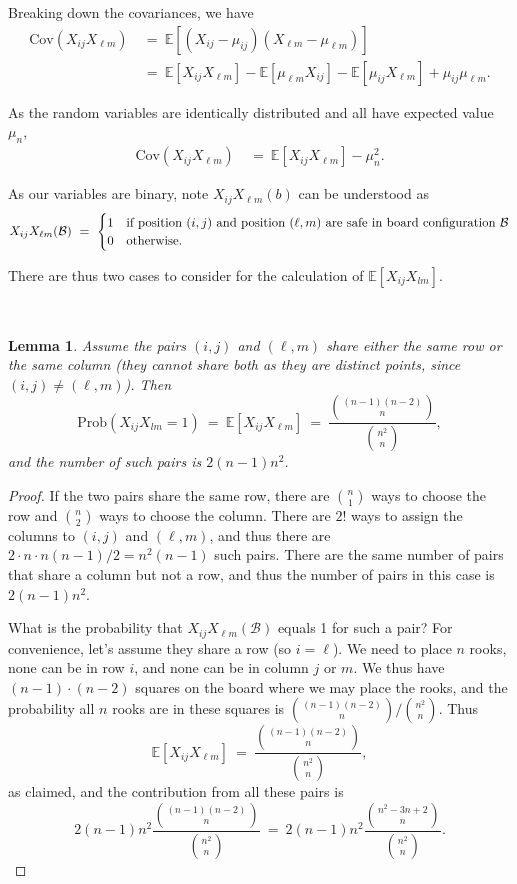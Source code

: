 \documentclass[12pt,reqno]{amsart}
\newcommand{\E}{\mathbb{E}}
\renewcommand{\E}{\mathbb{E}}
\numberwithin{equation}{section}
\newtheorem{lem}[thm]{Lemma}
\theoremstyle{plain}
\newcommand\be{\begin{equation}}
\newcommand\ee{\end{equation}}
\newcommand{\ncr}[2]{{#1 \choose #2}}
\newcommand{\twocase}[5]{#1 \begin{cases} #2 & \text{{\rm #3}}\\ #4 &\text{{\rm #5}} \end{cases}}
\begin{document}
Breaking down the covariances, we have
\begin{align}
    \text{Cov}\left(X_{ij}X_{\ell m}\right) &\ = \  \E[\left(X_{ij} - \mu_{ij}\right)\left(X_{\ell m} - \mu_{\ell m}\right)]\nonumber\\
    &\ = \  \E[X_{ij}X_{\ell m}] - \E[\mu_{\ell m}X_{ij}] - \E[\mu_{ij}X_{\ell m}] + \mu_{ij}\mu_{\ell m}.
\end{align}

As the random variables are identically distributed and all have expected value $\mu_n$,
\begin{align}
    \text{Cov}\left(X_{ij}X_{\ell m}\right) &\ = \  \E[X_{ij}X_{\ell m}] - \mu_n^2.
\end{align}

As our variables are binary, note $X_{ij}X_{\ell m}(b)$ can be understood as
\be
\twocase{X_{ij}X_{\ell m}(\mathcal{B})\ = \ }{1}{if position $(i, j)$ and position $(\ell,m)$ are safe in board configuration $\mathcal{B}$}{0}{otherwise.} \ee

There are thus two cases to consider for the calculation of $\E[X_{ij}X_{lm}]$.

\ \\

\begin{lem}\label{lem:pairsoverlap} Assume the pairs $(i,j)$ and $(\ell, m)$ share either the same row or the same column (they cannot share both as they are distinct points, since $(i,j) \neq (\ell, m)$). Then \be \text{Prob}\left(X_{ij}X_{lm} = 1\right)\ =\ \E[X_{ij} X_{\ell m}] \ = \ \frac{\ncr{(n-1)(n-2)}{n}}{\ncr{n^2}{n}}, \ee and the number of such pairs is $2(n-1)n^2$. \end{lem}

\begin{proof}
If the two pairs share the same row, there are $\ncr{n}{1}$ ways to choose the row and $\ncr{n}{2}$ ways to choose the column. There are $2!$ ways to assign the columns to $(i,j)$ and $(\ell, m)$, and thus there are $2 \cdot n \cdot n(n-1)/2 = n^2(n-1)$ such pairs. There are the same number of pairs that share a column but not a row, and thus the number of pairs in this case is $2(n-1)n^2$.

What is the probability that $X_{ij} X_{\ell m}(\mathcal{B})$ equals 1 for such a pair? For convenience, let's assume they share a row (so $i=\ell$). We need to place $n$ rooks, none can be in row $i$, and none can be in column $j$ or $m$. We thus have $(n-1) \cdot (n-2)$ squares on the board where we may place the rooks, and the probability all $n$ rooks are in these squares is $\ncr{(n-1)(n-2)}{n} / \ncr{n^2}{n}$. Thus \be \E[X_{ij} X_{\ell m}] \ = \ \frac{\ncr{(n-1)(n-2)}{n}}{\ncr{n^2}{n}}, \ee as claimed, and the contribution from all these pairs is \be 2(n-1)n^2 \frac{\ncr{(n-1)(n-2)}{n}}{\ncr{n^2}{n}} \ = \ 2(n-1)n^2 \frac{\ncr{n^2-3n+2}{n}}{\ncr{n^2}{n}}. \ee
\end{proof}
\end{document}
